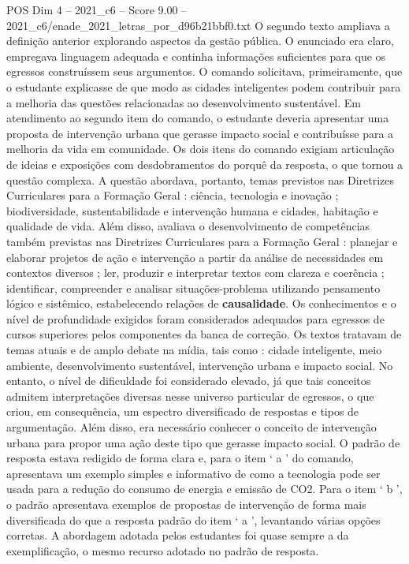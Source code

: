 \begin{textsample}{POS Dim 4 – 2021\_c6 – Score 9.00 – 2021\_c6/enade\_2021\_letras\_por\_d96b21bbf0.txt}
O segundo texto ampliava a definição anterior explorando aspectos da gestão pública.
O enunciado era claro, empregava linguagem adequada e continha informações suficientes para que os egressos construíssem seus argumentos.
O comando solicitava, primeiramente, que o estudante explicasse de que modo as cidades inteligentes podem contribuir para a melhoria das questões relacionadas ao desenvolvimento sustentável.
Em atendimento ao segundo item do comando, o estudante deveria apresentar uma proposta de intervenção urbana que gerasse impacto social e contribuísse para a melhoria da vida em comunidade.
Os dois itens do comando exigiam articulação de ideias e exposições com desdobramentos do porquê da resposta, o que tornou a questão complexa.
A questão abordava, portanto, temas previstos nas Diretrizes Curriculares para a Formação Geral : ciência, tecnologia e inovação ; biodiversidade, sustentabilidade e intervenção humana e cidades, habitação e qualidade de vida.
Além disso, avaliava o desenvolvimento de competências também previstas nas Diretrizes Curriculares para a Formação Geral : planejar e elaborar projetos de ação e intervenção a partir da análise de necessidades em contextos diversos ; ler, produzir e interpretar textos com clareza e coerência ; identificar, compreender e analisar situações-problema utilizando pensamento lógico e sistêmico, estabelecendo relações de \textbf{causalidade}.
Os conhecimentos e o nível de profundidade exigidos foram considerados adequados para egressos de cursos superiores pelos componentes da banca de correção.
Os textos tratavam de temas atuais e de amplo debate na mídia, tais como : cidade inteligente, meio ambiente, desenvolvimento sustentável, intervenção urbana e impacto social.
No entanto, o nível de dificuldade foi considerado elevado, já que tais conceitos admitem interpretações diversas nesse universo particular de egressos, o que criou, em consequência, um espectro diversificado de respostas e tipos de argumentação.
Além disso, era necessário conhecer o conceito de intervenção urbana para propor uma ação deste tipo que gerasse impacto social.
O padrão de resposta estava redigido de forma clara e, para o item ‘ a ’ do comando, apresentava um exemplo simples e informativo de como a tecnologia pode ser usada para a redução do consumo de energia e emissão de CO2.
Para o item ‘ b ’, o padrão apresentava exemplos de propostas de intervenção de forma mais diversificada do que a resposta padrão do item ‘ a ’, levantando várias opções corretas.
A abordagem adotada pelos estudantes foi quase sempre a da exemplificação, o mesmo recurso adotado no padrão de resposta.

\end{textsample}
